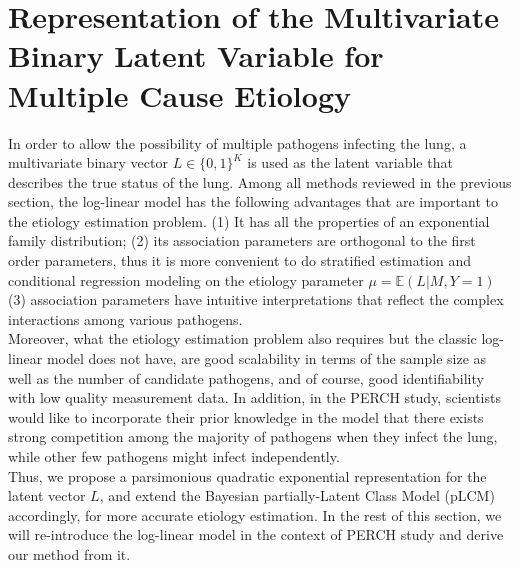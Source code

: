 \documentclass[11 pt, a4paper]{article}  %
\begin{document}
\section{Representation of the Multivariate Binary Latent Variable for Multiple Cause Etiology}
In order to allow the possibility of multiple pathogens infecting the lung, a multivariate binary vector $L\in \{0,1 \}^K$ is used as the latent variable that describes the true status of the lung. Among all methods reviewed in the previous section, the log-linear model has the following advantages that are important to the etiology estimation problem. (1) It has all the properties of an exponential family distribution; (2) its association parameters are orthogonal to the first order parameters, thus it is more convenient to do stratified estimation and conditional regression modeling on the etiology parameter $\mu=\mathbb{E}(L|M,Y=1)$ (3) association parameters have intuitive interpretations that reflect the complex interactions among various pathogens. \\

Moreover, what the etiology estimation problem also requires but the classic log-linear model does not have, are good scalability in terms of the sample size as well as the number of candidate pathogens, and of course, good identifiability with low quality measurement data. In addition, in the PERCH study, scientists would like to incorporate their prior knowledge in the model that there exists strong competition among the majority of pathogens when they infect the lung, while other few pathogens might infect independently.\\

Thus, we propose a parsimonious quadratic exponential representation for the latent vector $L$, and extend the Bayesian partially-Latent Class Model (pLCM) accordingly, for more accurate etiology estimation. In the rest of this section, we will re-introduce the log-linear model in the context of PERCH study and derive our method from it.\\
\end{document}
